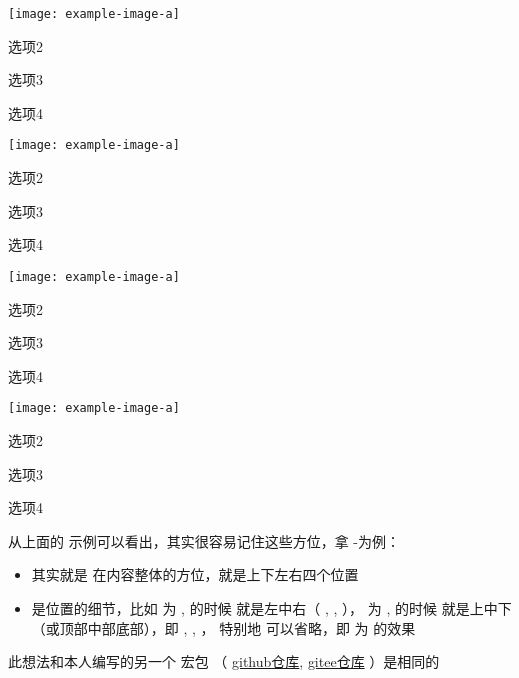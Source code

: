 \documentclass{xdyy-usermanual}
\begin{document}
\begin{vexample}
    \begin{xchoices}[label-pos = right]
      \item \texttt{[image: example-image-a]}
      \item 选项2
      \item 选项3
      \item 选项4
    \end{xchoices}
\end{vexample}
\begin{vexample}
    \begin{xchoices}[label-pos = right-center]
      \item \texttt{[image: example-image-a]}
      \item 选项2
      \item 选项3
      \item 选项4
    \end{xchoices}
\end{vexample}
\begin{vexample}
    \begin{xchoices}[label-pos = right-top]
      \item \texttt{[image: example-image-a]}
      \item 选项2
      \item 选项3
      \item 选项4
    \end{xchoices}
\end{vexample}
\begin{vexample}
    \begin{xchoices}[label-pos = right-bottom]
      \item \texttt{[image: example-image-a]}
      \item 选项2
      \item 选项3
      \item 选项4
    \end{xchoices}
\end{vexample}


从上面的  示例可以看出，其实很容易记住这些方位，拿 -为例：
  \begin{itemize}
    \item {} 其实就是  在内容整体的方位，就是上下左右四个位置
    \item {} 是位置的细节，比如  为 ,  的时候  就是左中右（ , ,  ）， 为 ,  的时候  就是上中下（或顶部中部底部），即 , , ， 特别地  可以省略，即  为  的效果
  \end{itemize}
此想法和本人编写的另一个  宏包 （
  \href{https://github.com/xkwxdyy/text-figure}{github仓库}, 
  \href{https://gitee.com/xkwxdyy/text-figure}{gitee仓库}
）是相同的
\end{document}
